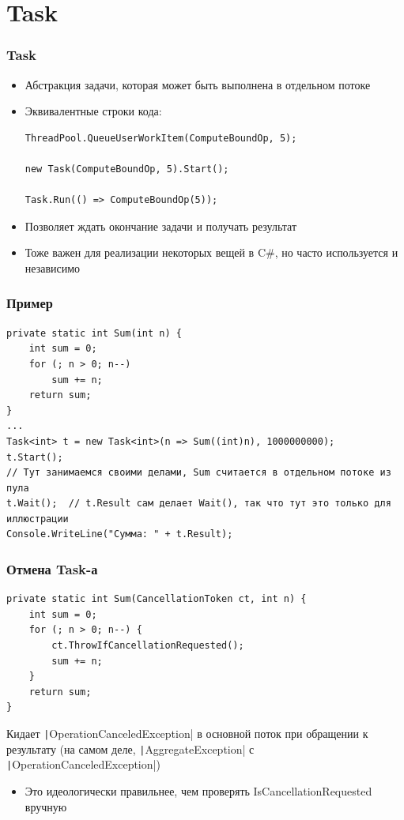 \documentclass[xetex,mathserif,serif]{beamer}
\begin{document}
    \section{Task}

    \begin{frame}[fragile]
        \frametitle{Task}
        \begin{itemize}
            \item Абстракция задачи, которая может быть выполнена в отдельном потоке
            \item Эквивалентные строки кода:
                \begin{verbatim}
ThreadPool.QueueUserWorkItem(ComputeBoundOp, 5);

new Task(ComputeBoundOp, 5).Start();

Task.Run(() => ComputeBoundOp(5));
                \end{verbatim}
            \item Позволяет ждать окончание задачи и получать результат
            \item Тоже важен для реализации некоторых вещей в C\#, но часто используется и независимо
        \end{itemize}
    \end{frame}

    \begin{frame}[fragile]
        \frametitle{Пример}
        \begin{footnotesize}
            \begin{verbatim}
private static int Sum(int n) {
    int sum = 0;
    for (; n > 0; n--)
        sum += n;
    return sum;
}
...
Task<int> t = new Task<int>(n => Sum((int)n), 1000000000);
t.Start();
// Тут занимаемся своими делами, Sum считается в отдельном потоке из пула
t.Wait();  // t.Result сам делает Wait(), так что тут это только для иллюстрации
Console.WriteLine("Сумма: " + t.Result);
            \end{verbatim}
        \end{footnotesize}
    \end{frame}

    \begin{frame}[fragile]
        \frametitle{Отмена Task-а}
        \begin{verbatim}
private static int Sum(CancellationToken ct, int n) {
    int sum = 0;
    for (; n > 0; n--) {
        ct.ThrowIfCancellationRequested();
        sum += n;
    }
    return sum;
}
        \end{verbatim}
        \vspace{3mm}
        Кидает \texttt|OperationCanceledException| в основной поток при обращении к результату (на самом деле, \texttt|AggregateException| с \texttt|OperationCanceledException|)
        \begin{itemize}
            \item Это идеологически правильнее, чем проверять IsCancellationRequested вручную
        \end{itemize}
    \end{frame}
\end{document}
